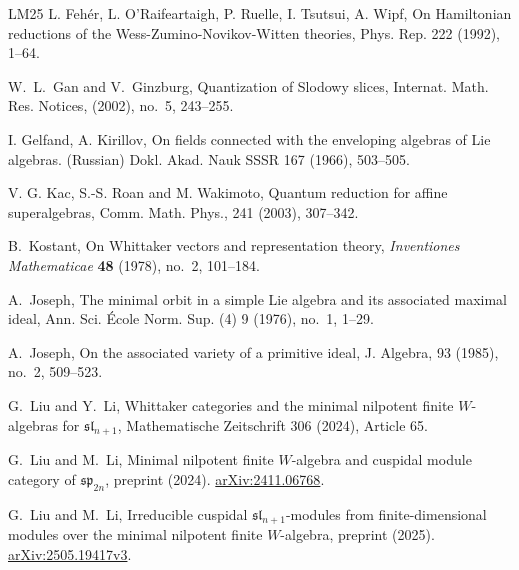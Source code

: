 \documentclass[12pt,a4paper]{amsart}
\numberwithin{equation}{section}
\theoremstyle{definition}
\theoremstyle{remark}
\begin{document}
\begin{thebibliography}{LM25}
 L. Feh\'er, L. O'Raifeartaigh, P. Ruelle, I. Tsutsui, A. Wipf, On Hamiltonian reductions of the
Wess-Zumino-Novikov-Witten theories, Phys. Rep. 222 (1992), 1--64.


W.~L.~Gan and V.~Ginzburg,
Quantization of Slodowy slices, Internat. Math. Res.
Notices, (2002), no.~5, 243--255.



 I. Gelfand, A. Kirillov, On fields connected with the enveloping algebras of Lie algebras. (Russian) Dokl. Akad. Nauk SSSR
167 (1966), 503--505.




 V. G. Kac, S.-S. Roan and M. Wakimoto, Quantum reduction for affine superalgebras, Comm. Math. Phys., 241 (2003), 307--342.

B.~Kostant,
On Whittaker vectors and representation theory,
\emph{Inventiones Mathematicae} \textbf{48} (1978), no.~2, 101--184.

A.~Joseph,
 The minimal orbit in a simple Lie algebra and its associated
maximal ideal,
 Ann. Sci. \'{E}cole Norm. Sup. (4)
9 (1976), no.~1, 1--29.

A.~Joseph,
 On the associated variety of a primitive ideal,
 J. Algebra,
93 (1985), no.~2, 509--523.

G.~Liu and Y.~Li,
Whittaker categories and the minimal nilpotent finite $W$-algebras for $\mathfrak{sl}_{n+1}$,
Mathematische Zeitschrift 306 (2024), Article 65.


G.~Liu and M.~Li,
Minimal nilpotent finite \(W\)-algebra and cuspidal module category
of \(\mathfrak{sp}_{2n}\),
preprint (2024).
\href{https://arxiv.org/abs/2411.06768}{arXiv:2411.06768}.

G.~Liu and M.~Li,
Irreducible cuspidal \(\mathfrak{sl}_{n+1}\)-modules from
finite-dimensional modules over the minimal nilpotent finite \(W\)-algebra,
preprint (2025).
\href{https://arxiv.org/abs/2505.19417v3}{arXiv:2505.19417v3}.




\end{thebibliography}
\end{document}
